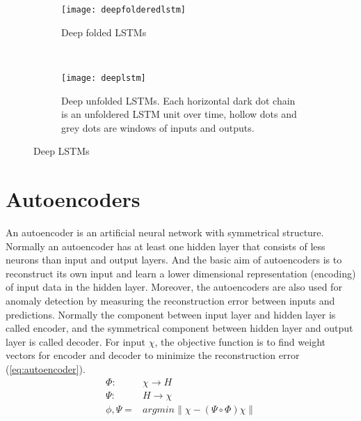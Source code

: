 \begin{figure}[hb]
\centering
	\begin {subfigure}[t]{0.45\textwidth}
	\centering
	\texttt{[image: deepfolderedlstm]}
	\caption{Deep folded LSTMs}
	\label{fig:deeplstm1}
	\end{subfigure}
	~
	\begin {subfigure}[t]{0.45\textwidth}
	\centering
	\texttt{[image: deeplstm]}
	\caption{Deep unfolded LSTMs. Each horizontal dark dot chain is an unfoldered LSTM unit over time, hollow dots and grey dots are windows of inputs and outputs.}
	\label{fig:deeplstm2}
	\end{subfigure}
	\caption[Deep LSTMs]{Deep LSTMs}
\label{fig:deeplstm}

\end{figure}

\section{Autoencoders}
\label{sec:Autoencoders}

An autoencoder is an artificial neural network with symmetrical structure. Normally an autoencoder has at least one hidden layer that consists of less neurons than input and output layers. And the basic aim of autoencoders is to reconstruct its own input and learn a lower dimensional representation (encoding) of input data in the hidden layer. Moreover, the autoencoders are also used for anomaly detection by measuring the reconstruction error between inputs and predictions.
Normally the component between input layer and hidden layer is called encoder, and the symmetrical component between hidden layer and output layer is called decoder. For input $\chi$, the objective function is to find weight vectors for encoder and decoder to minimize the reconstruction error (\ref{eq:autoencoder}).
\begin{equation} \label{eq:autoencoder}
\begin{aligned}
\Phi : &\chi \rightarrow H \\
\Psi : &H \rightarrow \chi \\
\phi, \Psi = &argmin \left \| \chi-(\Psi \circ \Phi)\chi \right \| 
\end{aligned}
\end{equation}

